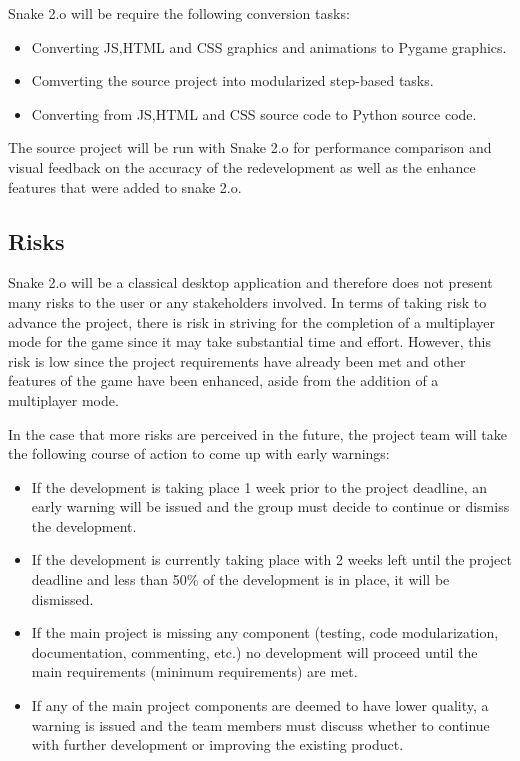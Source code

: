 \documentclass[12pt, titlepage]{article}
\begin{document}
Snake 2.o will be require the following conversion tasks:
\begin{itemize}
\item Converting JS,HTML and CSS graphics and animations to Pygame graphics.
\item Comverting the source project into modularized step-based tasks.
\item Converting from JS,HTML and CSS source code to Python source code.
\end{itemize}

The source project will be run with Snake 2.o for performance comparison and visual feedback on the accuracy of the redevelopment as well as the enhance features that were added to snake 2.o. 

\subsection{Risks}

Snake 2.o will be a classical desktop application and therefore does not present many risks to the user or any stakeholders involved. In terms of taking risk to advance the project, there is risk in striving for the completion of a multiplayer mode for the game since it may take substantial time and effort. However, this risk is low since the project requirements have already been met and other features of the game have been enhanced, aside from the addition of a multiplayer mode. 

In the case that more risks are perceived in the future, the project team will take the following course of action to come up with early warnings:
\begin{itemize}
\item If the development is taking place 1 week prior to the project deadline, an early warning will be issued and the group must decide to continue or dismiss the development.
\item If the development is currently taking place with 2 weeks left until the project deadline and less than 50\% of the development is in place, it will be dismissed.
\item If the main project is missing any component (testing, code modularization, documentation, commenting, etc.) no development will proceed until the main requirements (minimum requirements) are met.
\item If any of the main project components are deemed to have lower quality, a warning is issued and the team members must discuss whether to continue with further development or improving the existing product.
\end{itemize}
\end{document}
